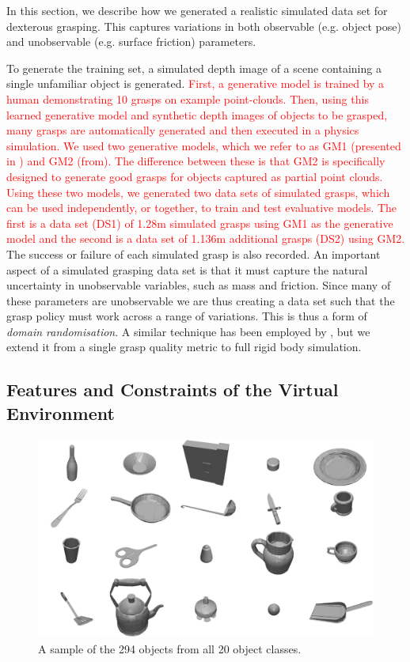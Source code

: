 In this section, we describe how we generated a realistic simulated data set for dexterous grasping. This captures variations in both observable (e.g. object pose) and unobservable (e.g. surface friction) parameters.

To generate the training set, a simulated depth image of a scene containing a single unfamiliar object is generated. \textcolor{red}{First, a generative model is trained by a human demonstrating 10 grasps on example point-clouds. Then, using this learned generative model and synthetic depth images of objects to be grasped, many grasps are automatically generated and then executed in a physics simulation. We used two generative models, which we refer to as GM1 (presented in \cite{kopicki2015ijrr}) and GM2 (from\cite{kopicki2019ijrr}). The difference between these is that GM2 is specifically designed to generate good grasps for objects captured as partial point clouds. Using these two models, we generated two data sets of simulated grasps, which can be used independently, or together, to train and test evaluative models. The first is a data set (DS1) of 1.28m simulated grasps using GM1 as the generative model and the second is a data set of 1.136m additional grasps (DS2) using GM2.} The success or failure of each simulated grasp is also recorded. An important aspect of a simulated grasping data set is that it must capture the natural uncertainty in unobservable variables, such as mass and friction. Since many of these parameters are unobservable we are thus creating a data set such that the grasp policy must work across a range of variations. This is thus a form of {\em domain randomisation}. A similar technique has been employed by \cite{mahler2017dex}, but we extend it from a single grasp quality metric to full rigid body simulation.

\subsection{Features and Constraints of the Virtual Environment}
\label{subsection:environment}

\begin{figure}[t]
\begin{center}
  \includegraphics[width=0.7\columnwidth]{images/allObjects-small.pdf}
  \end{center}
  \caption{A sample of the 294 objects from all 20 object classes.
  \label{fig:allObjects}}
\end{figure}

